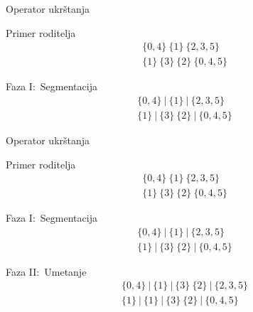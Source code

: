 \documentclass[aspectratio=169,xcolor=dvipsnames]{beamer}
\begin{document}

\begin{frame}{Operator ukrštanja}
    \begin{exampleblock}{Primer roditelja}
        \[
            \begin{aligned}
                \{0, 4\}\ \{1\}\ \{2, 3, 5\} \\
                \{1\}\ \{3\}\ \{2\}\ \{0, 4, 5\}
            \end{aligned}
        \]
    \end{exampleblock}
    \begin{exampleblock}{Faza I:\ Segmentacija}
        \[
            \begin{aligned}
                \{0, 4\}\ |\ \{1\}\ |\ \{2, 3, 5\} \\
                \{1\}\ |\ \{3\}\ \{2\}\ |\ \{0, 4, 5\}
            \end{aligned}
        \]
    \end{exampleblock}
\end{frame}


\begin{frame}{Operator ukrštanja}
    \begin{exampleblock}{Primer roditelja}
        \[
            \begin{aligned}
                \{0, 4\}\ \{1\}\ \{2, 3, 5\} \\
                \{1\}\ \{3\}\ \{2\}\ \{0, 4, 5\}
            \end{aligned}
        \]
    \end{exampleblock}
    \begin{exampleblock}{Faza I:\ Segmentacija}
        \[
            \begin{aligned}
                \{0, 4\}\ |\ \{1\}\ |\ \{2, 3, 5\} \\
                \{1\}\ |\ \{3\}\ \{2\}\ |\ \{0, 4, 5\}
            \end{aligned}
        \]
    \end{exampleblock}
    \begin{exampleblock}{Faza II:\ Umetanje}
        \[
            \begin{aligned}
                \{0, 4\}\ |\ \{1\}\ |\ \{3\}\ \{2\}\ |\ \{2, 3, 5\} \\
                \{1\}\ |\ \{1\}\ |\ \{3\}\ \{2\}\ |\ \{0, 4, 5\}
            \end{aligned}
        \]
    \end{exampleblock}
\end{frame}
\end{document}
